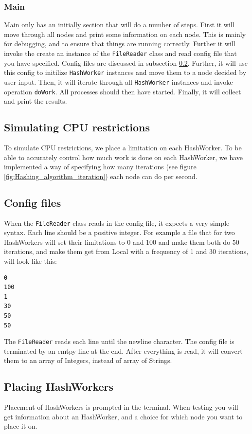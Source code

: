 \subsubsection{Main}
Main only has an initially section that will do a number of steps. First it will move through all nodes and print some information on each node. This is mainly for debugging, and to ensure that things are running correctly. Further it will invoke the create an instance of the \verb|FileReader| class and read config file that you have specified. Config files are discussed in subsection \ref{subsection:configfiles}. Further, it will use this config to initilize \verb|HashWorker| instances and move them to a node decided by user input. Then, it will iterate through all \verb|HashWorker| instances and invoke operation \verb|doWork|. All processes should then have started. Finally, it will collect and print the results.



\subsection{Simulating CPU restrictions}
To simulate CPU restrictions, we place a limitation on each HashWorker. To be able to accurately control how much work is done on each HashWorker, we have implemented a way of specifying how many iterations (see figure \ref{fig:Hashing_algorithm_iteration}) each node can do per second.



\subsection{Config files}\label{subsection:configfiles}
When the \verb|FileReader| class reads in the config file, it expects a very simple syntax. Each line should be a positive integer. For example a file that for two HashWorkers will set their limitations to 0 and 100 and make them both do 50 iterations, and make them get from Local with a frequency of 1 and 30 iterations, will look like this:
\begin{lstlisting}
0
100
1
30
50
50

\end{lstlisting}
The \verb|FileReader| reads each line until the newline character. The config file is terminated by an emtpy line at the end. After everything is read, it will convert them to an array of Integers, instead of array of Strings.

\subsection{Placing HashWorkers}
Placement of HashWorkers is prompted in the terminal. When testing you will get information about an HashWorker, and a choice for which node you want to place it on. 














